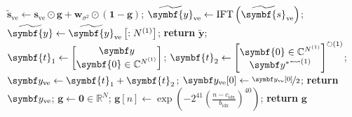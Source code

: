 \begin{algorithm}[h!]
\begin{algorithmic}[1]
            \EndFor
            \State $\widetilde{\symbf{s}}_{\text{ve}} \gets \symbf{s}_{\text{ve}} \odot \symbf{g} + \symbf{w}_{\sigma^2} \odot \left(\symbf{1} - \symbf{g}\right)$;
            \State $\widetilde{\symbf{y}}_{\text{ve}} \gets \IFT \left( \widetilde{\symbf{s}}_{\text{ve}} \right)$;
            \State $\widetilde{\symbf{y}} \gets \widetilde{\symbf{y}}_{\text{ve}}\left[ : \None \right]$;
            \State \textbf{return} $\widetilde{\symbf{y}}$;
        \EndProcedure
        \Statex
            \State $\symbf{t}_1 \gets
            \begin{bmatrix}
                \by \\ \symbf{0} \in \mathbb{C}^{\None}
            \end{bmatrix}
            $;
            \State $\symbf{t}_2 \gets
            \begin{bmatrix}
            \symbf{0} \in \mathbb{C}^{\None} \\ {\by^*}^{\leftrightsquigarrow (1)}
            \end{bmatrix}^{\circlearrowright (1)}
            $;
            \State $\by_{\text{ve}} \gets \symbf{t}_1 + \symbf{t}_2$;
            \State $\by_{\text{ve}}[0] \gets \nicefrac{\by_{\text{ve}}[0]}{2}$;
            \State \textbf{return} $\by_{\text{ve}}$;
        \EndProcedure
        \Statex
            \State $\symbf{g} \gets \symbf{0} \in \mathbb{R}^{N}$;
                \State $\symbf{g}\left[ n \right] \gets \exp\left(
                    -2^{41} \left(
                        \frac{n - c_{\text{idx}}}{b_{\text{idx}}}
                    \right)^{40}
                    \right)
                $;
            \EndFor
            \State \textbf{return} $\symbf{g}$
        \EndProcedure
    \end{algorithmic}
\end{algorithm}

